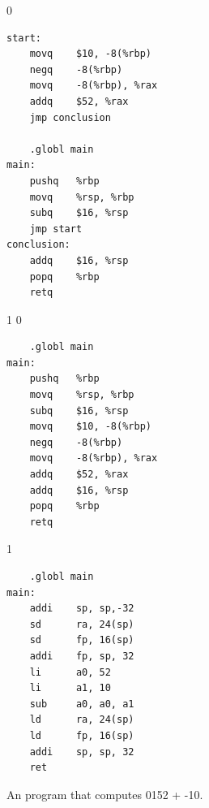 \documentclass[7x10]{TimesAPriori_MIT}%
\def\racketEd{0}
\def\pythonEd{1}
\def\edition{1}
\def\xeightysixEd{0}
\def\riscvEd{1}
\def\architecture{1}
\newcommand{\racket}[1]{{\if\edition\racketEd{#1}\fi}}
\newcommand{\pythonColor}[0]{}
\newcommand{\python}[1]{{\if\edition\pythonEd\pythonColor #1\fi}}
\numberwithin{theorem}{chapter}
\numberwithin{definition}{chapter}
\numberwithin{equation}{chapter}
\begin{document}
\begin{figure}[tbp]
  \begin{minipage}{0.66\textwidth}
    \begin{tcolorbox}[colback=white]
      {\if\edition\racketEd
\begin{lstlisting}
start:
	movq	$10, -8(%rbp)
	negq	-8(%rbp)
	movq	-8(%rbp), %rax
	addq	$52, %rax
	jmp conclusion

	.globl main
main:
	pushq	%rbp
	movq	%rsp, %rbp
	subq	$16, %rsp
	jmp start
conclusion:
	addq	$16, %rsp
	popq	%rbp
	retq
\end{lstlisting}
\fi}
{\if\edition\pythonEd\pythonColor
\if\architecture\xeightysixEd
\begin{lstlisting}
    .globl main
main:
    pushq	%rbp
    movq	%rsp, %rbp
    subq	$16, %rsp
    movq	$10, -8(%rbp)
    negq	-8(%rbp)
    movq	-8(%rbp), %rax
    addq	$52, %rax
    addq	$16, %rsp
    popq	%rbp
    retq
\end{lstlisting}
\fi
\if\architecture\riscvEd
\begin{lstlisting}
    .globl main
main:
    addi    sp, sp,-32
    sd      ra, 24(sp)
    sd      fp, 16(sp)
    addi    fp, sp, 32
    li      a0, 52
    li      a1, 10
    sub     a0, a0, a1
    ld      ra, 24(sp)
    ld      fp, 16(sp)
    addi    sp, sp, 32
    ret
\end{lstlisting}
\fi
\fi}
  \end{tcolorbox}
  \end{minipage}
  \caption{An {\ArchName} program that computes
  \racket{}\python{52 + -10}.}
\label{fig:p1-x86}
\end{figure}
\end{document}
